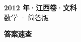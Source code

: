 \documentclass[zihao=-4, a4paper]{ctexart}
\begin{document}
\begin{center}
  {\Large\bfseries 2012 年·江西卷·文科}\\[4pt]
  {\large 数学 · 简答版}
\end{center}
\medskip
{}

\clearpage
{}
\begin{center}{\Large\bfseries 答案速查}\end{center}
\medskip

\end{document}
